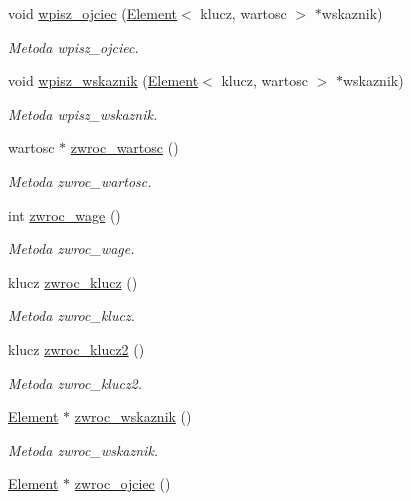 \begin{DoxyCompactItemize}
void \hyperlink{class_element_a9d169d81af34f308bc80b6fdcc87e139}{wpisz\+\_\+ojciec} (\hyperlink{class_element}{Element}$<$ klucz, wartosc $>$ $\ast$wskaznik)
\begin{DoxyCompactList}\small\item\em Metoda wpisz\+\_\+ojciec. \end{DoxyCompactList}\item 
void \hyperlink{class_element_ac2dd0d138001f2de876f306b83298914}{wpisz\+\_\+wskaznik} (\hyperlink{class_element}{Element}$<$ klucz, wartosc $>$ $\ast$wskaznik)
\begin{DoxyCompactList}\small\item\em Metoda wpisz\+\_\+wskaznik. \end{DoxyCompactList}\item 
wartosc $\ast$ \hyperlink{class_element_a1cfca5911c61ac275fd60c9d9c173b6d}{zwroc\+\_\+wartosc} ()
\begin{DoxyCompactList}\small\item\em Metoda zwroc\+\_\+wartosc. \end{DoxyCompactList}\item 
int \hyperlink{class_element_a748fcfad2139d088fd7f612578663909}{zwroc\+\_\+wage} ()
\begin{DoxyCompactList}\small\item\em Metoda zwroc\+\_\+wage. \end{DoxyCompactList}\item 
klucz \hyperlink{class_element_a4041559698851d33d77d9c457f3a5da4}{zwroc\+\_\+klucz} ()
\begin{DoxyCompactList}\small\item\em Metoda zwroc\+\_\+klucz. \end{DoxyCompactList}\item 
klucz \hyperlink{class_element_a432a0f6d8a5291051644667a39a3c1ba}{zwroc\+\_\+klucz2} ()
\begin{DoxyCompactList}\small\item\em Metoda zwroc\+\_\+klucz2. \end{DoxyCompactList}\item 
\hyperlink{class_element}{Element} $\ast$ \hyperlink{class_element_acee0fb7c5bbe330961d16e6e672d07d2}{zwroc\+\_\+wskaznik} ()
\begin{DoxyCompactList}\small\item\em Metoda zwroc\+\_\+wskaznik. \end{DoxyCompactList}\item 
\hyperlink{class_element}{Element} $\ast$ \hyperlink{class_element_ac24b7bfe84763613a838012e85ad4ac4}{zwroc\+\_\+ojciec} ()

\end{DoxyCompactItemize}
